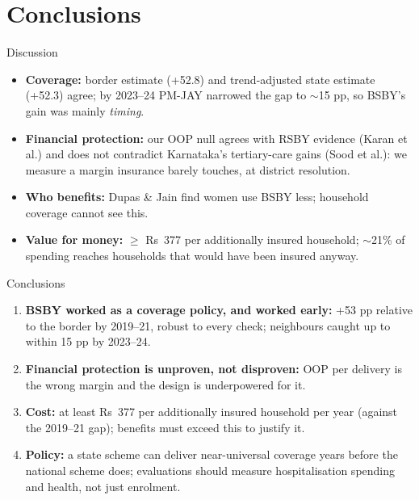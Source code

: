 \documentclass[compress]{beamer}
\newcommand{\Rs}{Rs~}
\begin{document}
\section{Conclusions}

\begin{frame}[t]{Discussion}
\small
\begin{itemize}
\item \textbf{Coverage:} border estimate (+52.8) and trend-adjusted state estimate (+52.3) agree; by 2023--24 PM-JAY narrowed the gap to $\sim$15 pp, so BSBY's gain was mainly \emph{timing}.
\item \textbf{Financial protection:} our OOP null agrees with RSBY evidence (Karan et al.) and does not contradict Karnataka's tertiary-care gains (Sood et al.): we measure a margin insurance barely touches, at district resolution.
\item \textbf{Who benefits:} Dupas \& Jain find women use BSBY less; household coverage cannot see this.
\item \textbf{Value for money:} $\ge$ \Rs 377 per additionally insured household; $\sim$21\% of spending reaches households that would have been insured anyway.
\end{itemize}
\end{frame}

\begin{frame}[t]{Conclusions}
\begin{enumerate}
\item \textbf{BSBY worked as a coverage policy, and worked early:} +53 pp relative to the border by 2019--21, robust to every check; neighbours caught up to within 15 pp by 2023--24.
\item \textbf{Financial protection is unproven, not disproven:} OOP per delivery is the wrong margin and the design is underpowered for it.
\item \textbf{Cost:} at least \Rs 377 per additionally insured household per year (against the 2019--21 gap); benefits must exceed this to justify it.
\item \textbf{Policy:} a state scheme can deliver near-universal coverage years before the national scheme does; evaluations should measure hospitalisation spending and health, not just enrolment.
\end{enumerate}
\end{frame}
\end{document}
